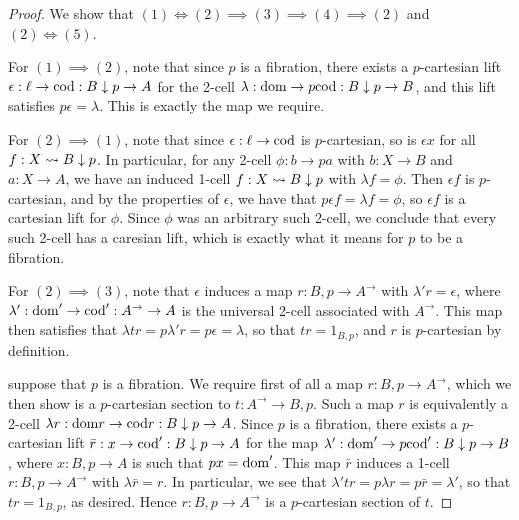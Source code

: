\documentclass[../thesis.tex]{subfiles}
\begin{document}
  \begin{proof}
    We show that $(1) \iff (2) \implies (3) \implies (4) \implies (2)$ and $(2) \iff (5)$.

    For $(1) \implies (2)$, note that since $p$ is a fibration, there exists a $p$-cartesian lift $\epsilon : \ell
    \to {\mathrm{cod}} : B \mathrel{\downarrow} p \to A$ for the 2-cell $\lambda : {\mathrm{dom}} \to p{\mathrm{cod}} : B \mathrel{\downarrow} p \to B$, and this lift
    satisfies $p\epsilon = \lambda$. This is exactly the map we require.

    For $(2) \implies (1)$, note that since $\epsilon : \ell \to {\mathrm{cod}}$ is $p$-cartesian, so is $\epsilon x$ for
    all $f : X \rightsquigarrow B \mathrel{\downarrow} p$. In particular, for any 2-cell $\phi : b \to pa$ with $b : X \to B$ and $a : X
    \to A$, we have an induced 1-cell $f : X \rightsquigarrow B \mathrel{\downarrow} p$ with $\lambda f = \phi$. Then $\epsilon f$ is $p$-%
    cartesian, and by the properties of $\epsilon$, we have that $p\epsilon f = \lambda f = \phi$, so $\epsilon f$
    is a cartesian lift for $\phi$. Since $\phi$ was an arbitrary such 2-cell, we conclude that every such 2-cell
    has a caresian lift, which is exactly what it means for $p$ to be a fibration.


    For $(2) \implies (3)$, note that $\epsilon$ induces a map $r : B \comma p \to A^\to$ with $\lambda'r =
    \epsilon$, where $\lambda' : {\mathrm{dom}}' \to {\mathrm{cod}}' : A^\to \to A$ is the universal 2-cell associated with $A^\to$.
    This map then satisfies that $\lambda tr = p\lambda' r = p\epsilon = \lambda$, so that $tr = 1_{B \comma p}$,
    and $r$ is $p$-cartesian by definition.

    suppose that $p$ is a fibration. We require first of all a map $r : B \comma p \to
    A^\to$, which we then show is a $p$-cartesian section to $t : A^\to \to B \comma p$. Such a map $r$ is
    equivalently a 2-cell $\lambda r : {\mathrm{dom}} r \to {\mathrm{cod}} r : B \mathrel{\downarrow} p \to A$. Since $p$ is a fibration, there
    exists a $p$-cartesian lift $\bar r : x \to {\mathrm{cod}}' : B \mathrel{\downarrow} p \to A$ for the map $\lambda' : {\mathrm{dom}}' \to p
    {\mathrm{cod}}' : B \mathrel{\downarrow} p \to B$, where $x : B \comma p \to A$ is such that $px = {\mathrm{dom}}'$. This map $\bar r$ induces
    a 1-cell $r : B \comma p \to A^\to$ with $\lambda \bar r = r$. In particular, we see that $\lambda' t r =
    p\lambda r = p\bar r = \lambda'$, so that $tr = 1_{B \comma p}$, as desired. Hence $r : B \comma p \to A^\to$
    is a $p$-cartesian section of $t$.


\end{proof}
\end{document}
